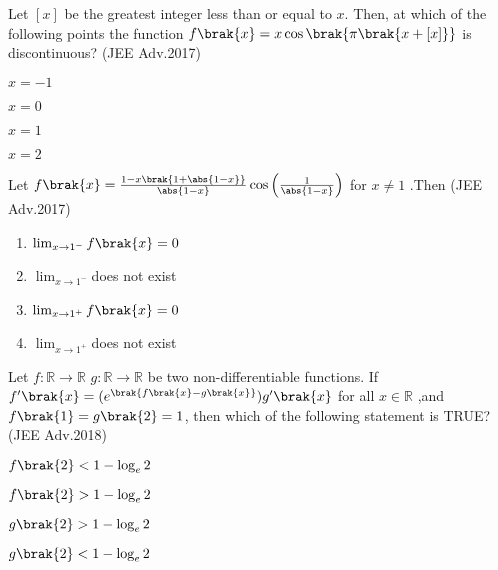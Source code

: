 \iffalse
\title{Limits, Continuity and Differentiability}
\author{EE24BTECH11050 - Pothuri Rahul}
\section{mcq-multiple}
\fi
\item %
Let $[x]$ be the greatest integer less than or equal to $x$. Then, at which of the following points the function
$f\brak{x} = x \cos\brak{\pi\brak{x + [x]}}$ is discontinuous? 
 \hfill  (JEE Adv.2017) \\
\begin{enumerate} 
\begin{multicols}{2}
\item $x=-1$
\item $x=0$
\end{multicols}
\begin{multicols}{2}
\item $x=1$
\item $x=2$
\end{multicols}
\end{enumerate}
\item %
 Let $f\brak{x}=\frac{1-x \brak{1+\abs{1-x}}}{\abs{1-x}}\cos\left(\frac{1}{\abs{1-x}}\right)$ for $x\neq1$ .Then  
\hfill (JEE Adv.2017) \\ 
\begin{enumerate}
\item $\lim_{x\to1^-} f\brak{x}=0$ 
\item $\lim_{x\to1^-}$does not exist
\item $\lim_{x\to1^+} f\brak{x}=0$ 
\item $\lim_{x\to1^+}$does not exist 
\end{enumerate}
\item %
Let $f:\mathbb{R} \to \mathbb{R}$ $g:\mathbb{R} \to \mathbb{R}$ be two non-differentiable functions. If $f'\brak{x}=(e^{\brak{f\brak{x}-g\brak{x}}})g'\brak{x}$ for all $x\in \mathbb{R}$ ,and $f\brak{1}=g\brak{2}=1$, then which of the following statement  is  TRUE? 
\hfill  (JEE Adv.2018) \\ 
\begin{enumerate}
\begin{multicols}{2}
\item $f\brak{2}<1-\log_e 2$ 
\item $f\brak{2}>1-\log_e 2$ 
\end{multicols}
\begin{multicols}{2}
\item $g\brak{2}>1-\log_e 2$ 
\item $g\brak{2}<1-\log_e 2$ 
\end{multicols}
\end{enumerate}
